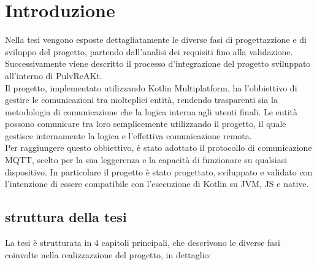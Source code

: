 \documentclass[12pt,a4paper,openright,twoside]{book}
\begin{document}
\chapter{Introduzione}\label{chap:Introduzione}

Nella tesi vengono esposte dettagliatamente le diverse fasi di progettazzione e di sviluppo del progetto, partendo dall'analisi dei requisiti fino alla validazione.
Successivamente viene descritto il processo d'integrazione del progetto sviluppato all'interno di PulvReAKt.\\
Il progetto, implementato utilizzando Kotlin Multiplatform, ha l'obbiettivo di gestire le comunicazioni tra molteplici entità, 
rendendo trasparenti sia la metodologia di comunicazione che la logica interna agli utenti finali.
Le entità possono comunicare tra loro semplicemente utilizzando il progetto, il quale gestisce internamente la logica e l'effettiva comunicazione remota.\\
Per raggiungere questo obbiettivo, è stato adottato il protocollo di comunicazione \acf{MQTT}, scelto per la sua leggerenza e la capacità di funzionare su qualsiasi dispositivo.
In particolare il progetto è stato progettato, sviluppato e validato con l'intenzione di essere compatibile con l'esecuzione di Kotlin su \acf{JVM}, \acf{JS} e native.
\pagebreak
\section{struttura della tesi}
La tesi è strutturata in 4 capitoli principali, che descrivono le diverse fasi coinvolte nella realizzazzione del progetto, in dettaglio:
\end{document}
